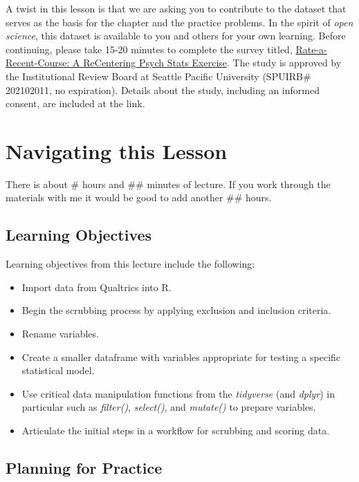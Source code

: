 \documentclass[
  english,
]{book}
\providecommand{\tightlist}{%
  \setlength{\itemsep}{0pt}\setlength{\parskip}{0pt}}
\begin{document}
A twist in this lesson is that we are asking you to contribute to the dataset that serves as the basis for the chapter and the practice problems. In the spirit of \emph{open science}, this dataset is available to you and others for your own learning. Before continuing, please take 15-20 minutes to complete the survey titled, \href{https://spupsych.az1.qualtrics.com/jfe/form/SV_b2cClqAlLGQ6nLU}{Rate-a-Recent-Course: A ReCentering Psych Stats Exercise}. The study is approved by the Institutional Review Board at Seattle Pacific University (SPUIRB\# 202102011, no expiration). Details about the study, including an informed consent, are included at the link.

\hypertarget{navigating-this-lesson}{%
\section{Navigating this Lesson}\label{navigating-this-lesson}}

There is about \# hours and \#\# minutes of lecture. If you work through the materials with me it would be good to add another \#\# hours.

\hypertarget{learning-objectives}{%
\subsection{Learning Objectives}\label{learning-objectives}}

Learning objectives from this lecture include the following:

\begin{itemize}
\tightlist
\item
  Import data from Qualtrics into R.
\item
  Begin the scrubbing process by applying exclusion and inclusion criteria.
\item
  Rename variables.
\item
  Create a smaller dataframe with variables appropriate for testing a specific statistical model.
\item
  Use critical data manipulation functions from the \emph{tidyverse} (and \emph{dplyr}) in particular such as \emph{filter()}, \emph{select()}, and \emph{mutate()} to prepare variables.
\item
  Articulate the initial steps in a workflow for scrubbing and scoring data.
\end{itemize}

\hypertarget{planning-for-practice}{%
\subsection{Planning for Practice}\label{planning-for-practice}}
\end{document}
